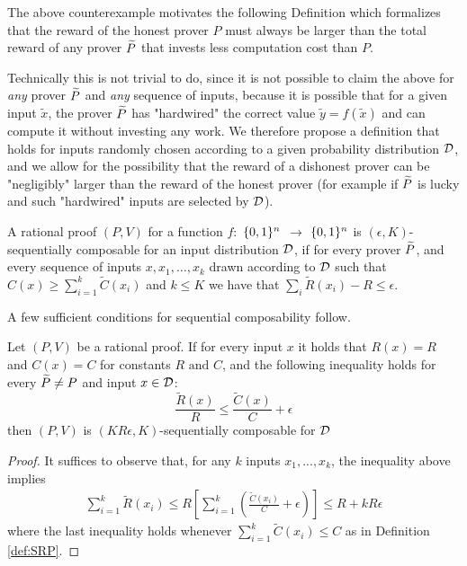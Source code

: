 
The above counterexample motivates the following Definition which formalizes 
that the reward of the honest prover $P$ must always be larger than the total 
reward of any prover $\widetilde{P}$ that invests less computation cost than $P$. 

Technically this is not trivial to do, since it is not possible to claim the above for {\em any} prover $\widetilde{P}$ and {\em any} sequence of inputs, because it
is possible that for a given input $\tilde{x}$, the prover $\widetilde{P}$ has "hardwired" the correct value $\tilde{y}=f(\tilde{x})$ and can compute it without investing 
any work. We therefore propose a definition that holds for inputs randomly chosen according to a given probability distribution $\cal D$, and we allow for
the possibility that the reward of a dishonest prover can be "negligibly" larger than the reward of the honest prover (for example if $\widetilde{P}$ is lucky and such 
"hardwired" inputs are selected by $\cal D$).

\noindent
\begin{definition}
	\label{def:SRP}
	A rational proof $(P,V)$ for a function $f:$ $\{0, 1\}^n$ $\to$ 
	$\{0, 1\}^n$ is $(\epsilon, K)$-{\sf sequentially composable} for an input distribution $\cal D$, if for every prover $\widetilde{P}$, 
	and every sequence of inputs 
	$x,x_1,\ldots,x_k$ drawn according to ${\cal D}$ such that $C(x) \geq \sum_{i=1}^k 
	\tilde{C}(x_i)$ and $k \leq K$ we have that $\sum_{i}\tilde{R}(x_i) - R \leq \epsilon$.
\end{definition}

\noindent
A few sufficient conditions for sequential composability follow.

\begin{lemma}
\label{lemma:cost-rew-ratios}
Let $(P,V)$ be a rational proof.
If for every input $x$  it holds that $R(x)=R$ and  $C(x)=C$ for constants 
$R \mbox{ and } C$, and the 
following inequality holds for every 
$\widetilde{P}\neq 
P$ and input $x\in {\cal D}$:
\[ \frac{\tilde{R}(x)}{R} \leq \frac{\tilde{C}(x)}{C} + \epsilon\]
then $(P,V)$ is $(KR\epsilon, K)$-sequentially composable for $\cal D$
\end{lemma}
\begin{proof}
It suffices to observe that, for any $k$ inputs $x_1,...,x_k$, the inequality 
above 
implies
\begin{align*}
\sum_{i=1}^{k}\tilde{R}(x_i)  \leq R [\sum_{i=1}^{k} (\frac{\tilde{C}(x_i)}{C}  + \epsilon) ] 
\leq R +kR\epsilon
\end{align*}
where the last inequality holds whenever $\sum_{i=1}^{k} \tilde{C}(x_i) \leq C$ 
as 
in Definition \ref{def:SRP}.
\end{proof}

